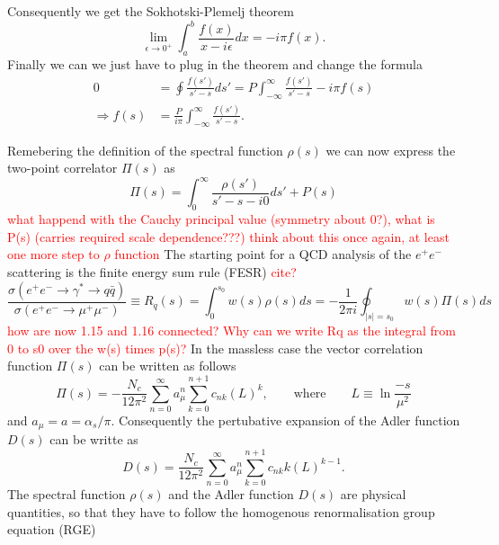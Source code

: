 \documentclass[11pt,a4paper]{article}
\begin{document}
Consequently we get the Sokhotski-Plemelj theorem
\begin{equation}
	\lim_{\epsilon \to 0^+} \int_a^b \frac{f(x)}{x-i\epsilon}dx = -i\pi f(x).
\end{equation}
Finally we can we just have to plug in the theorem and change the formula
\begin{equation}
\begin{split}
	0 &= \oint \frac{f(s')}{s'-s} ds' = P \int_{-\infty}^\infty \frac{f(s')}{s'-s} - i\pi f(s)  \\
	\Rightarrow f(s) &= \frac{P}{i\pi} \int_{-\infty}^{\infty} \frac{f(s')}{s'-s}.
\end{split}
\end{equation}

Remebering the definition of the spectral function $\rho(s)$ we can now express the two-point correlator $\Pi(s)$ as 
\begin{equation}
	\Pi(s) = \int_0^\infty \frac{\rho(s')}{s' - s -i0} ds' + P(s)
\end{equation}
\textcolor{red}{what happend with the Cauchy principal value (symmetry about 0?), what is P(s) (carries required scale dependence???)}
\textcolor{red}{think about this once again, at least one more step to $\rho$ function}
The starting point for a QCD analysis of the $e^+ e^-$ scattering is the finite energy sum rule (FESR) \textcolor{red}{cite?}
\begin{equation}	
	\frac{\sigma(e^+e^- \to \gamma^* \to q \bar q)}{\sigma(e^+e^- \to \mu^+ \mu^-)} \equiv R_q(s) = \int_0^{s_0} w(s) \rho(s) ds = -\frac{1}{2\pi i} \oint_{|s|=s_0} w(s) \Pi(s) ds
\end{equation}
\textcolor{red}{how are now 1.15 and 1.16 connected? Why can we write Rq as the integral from 0 to s0 over the w(s) times p(s)?}
In the massless case the vector correlation function $\Pi(s)$ can be written as follows
\begin{equation}
	\Pi(s) = - \frac{N_c}{12\pi^2} \sum_{n=0}^{\infty} a_\mu^n \sum_{k=0}^{n+1} c_{nk} (L)^k, \qquad \text{where} \qquad L \equiv \ln \frac{-s}{\mu^2}
\end{equation}
and $a_\mu = a = \alpha_s / \pi$. Consequently the pertubative expansion of the Adler function $D(s)$ can be writte as
\begin{equation}
	D(s) = \frac{N_c}{12 \pi^2} \sum_{n=0}^{\infty} a_\mu^n \sum_{k=0}^{n+1} c_{nk} k (L)^{k-1}.
\end{equation}
The spectral function $\rho(s)$ and the Adler function $D(s)$ are physical quantities, so that they have to follow the homogenous renormalisation group equation (RGE)
\end{document}
